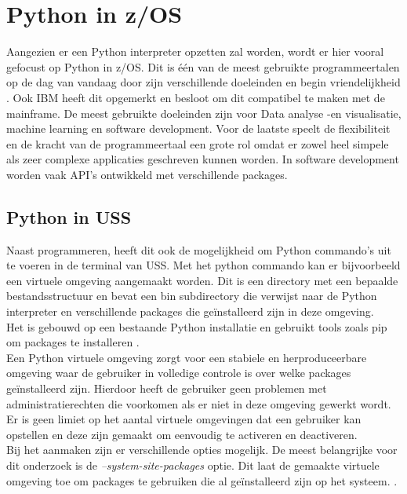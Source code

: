 \section{Python in z/OS}
Aangezien er een Python interpreter opzetten zal worden, wordt er hier vooral gefocust op Python in z/OS. Dit is één van de meest gebruikte programmeertalen op de dag van vandaag door zijn verschillende doeleinden en begin vriendelijkheid \autocite{Johnson2023}. Ook IBM heeft dit opgemerkt en besloot om dit compatibel te maken met de mainframe. De meest gebruikte doeleinden zijn voor Data analyse -en visualisatie, machine learning en software development. Voor de laatste speelt de flexibiliteit en de kracht van de programmeertaal een grote rol omdat er zowel heel simpele als zeer complexe applicaties geschreven kunnen worden. In software development worden vaak API's ontwikkeld met verschillende packages. \autocite{Kosourova2022} \\

\subsection{Python in USS}
Naast programmeren, heeft dit ook de mogelijkheid om Python commando's uit te voeren in de terminal van USS. Met het python commando kan er bijvoorbeeld een virtuele omgeving aangemaakt worden. Dit is een directory met een bepaalde bestandsstructuur en bevat een bin subdirectory die verwijst naar de Python interpreter en verschillende packages die geïnstalleerd zijn in deze omgeving.  \autocite{UniPrinceton2022} \\
Het is gebouwd op een bestaande Python installatie en gebruikt tools zoals pip om packages te installeren \autocite{PSF2024}. \\

Een Python virtuele omgeving zorgt voor een stabiele en herproduceerbare omgeving waar de gebruiker in volledige controle is over welke packages geïnstalleerd zijn. Hierdoor heeft de gebruiker geen problemen met administratierechten die voorkomen als er niet in deze omgeving gewerkt wordt. Er is geen limiet op het aantal virtuele omgevingen dat een gebruiker kan opstellen en deze zijn gemaakt om eenvoudig te activeren en deactiveren. \autocite{UniPrinceton2022} \\

Bij het aanmaken zijn er verschillende opties mogelijk. De meest belangrijke voor dit onderzoek is de \textit{--system-site-packages} optie. Dit laat de gemaakte virtuele omgeving toe om packages te gebruiken die al geïnstalleerd zijn op het systeem. \autocite{PSF2024}.

